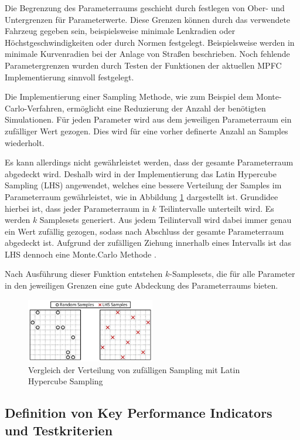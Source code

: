 Die Begrenzung des Parameterraums geschieht durch festlegen von Ober- und Untergrenzen für Parameterwerte. Diese Grenzen können durch das verwendete Fahrzeug gegeben sein, beispielsweise minimale Lenkradien oder Höchstgeschwindigkeiten oder durch Normen festgelegt. Beispielsweise werden in \cite{Bau2019} minimale Kurvenradien bei der Anlage von Straßen beschrieben. Noch fehlende Parametergrenzen wurden durch Testen der Funktionen der aktuellen MPFC Implementierung sinnvoll festgelegt.

Die Implementierung einer Sampling Methode, wie zum Beispiel dem Monte-Carlo-Verfahren, ermöglicht eine Reduzierung der Anzahl der benötigten Simulationen. Für jeden Parameter wird aus dem jeweiligen Parameterraum ein zufälliger Wert gezogen. Dies wird für eine vorher definerte Anzahl an Samples wiederholt.

Es kann allerdings nicht gewährleistet werden, dass der gesamte Parameterraum abgedeckt wird. Deshalb wird in der Implementierung das Latin Hypercube Sampling (LHS) angewendet, welches eine bessere Verteilung der Samples im Parameterraum gewährleistet, wie in Abbildung \ref{fig:Random_vs_LHS} dargestellt ist. Grundidee hierbei ist, dass jeder Parameterraum in $k$ Teilintervalle unterteilt wird. Es werden $k$ Samplesets generiert. Aus jedem Teilintervall wird dabei immer genau ein Wert zufällig gezogen, sodass nach Abschluss der gesamte Parameterraum abgedeckt ist. Aufgrund der zufälligen Ziehung innerhalb eines Intervalls ist das LHS dennoch eine Monte.Carlo Methode \cite{McKay1979}.\bigskip

\noindent Nach Ausführung dieser Funktion entstehen $k$-Samplesets, die für alle Parameter in den jeweiligen Grenzen eine gute Abdeckung des Parameterraums bieten.

\begin{figure}
    \centering
    \includegraphics[width=0.5\textwidth]{figures/3_Implementierung/LHS_random_compare.png}
    \caption{Vergleich der Verteilung von zufälligen Sampling mit Latin Hypercube Sampling \cite{Preece2015}}
    \label{fig:Random_vs_LHS}
\end{figure}

\subsection{Definition von Key Performance Indicators und Testkriterien} \label{subsec:KPI}

